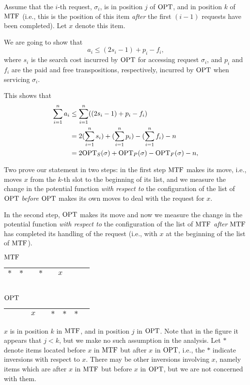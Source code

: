 \begin{frame}
Assume that the $i$-th request, $\sigma_i$, is in position $j$ of
$\mathrm{OPT}$, and in position $k$ of $\mathrm{MTF}$ (i.e., this is the position of this
item {\em after} the first $(i-1)$ requests have been completed).  Let
$x$ denote this item.

We are going to show that 
$$
a_i\le (2s_i-1)+p_i-f_i,
$$
where $s_i$ is the search cost incurred by $\mathrm{OPT}$ for accessing request
$\sigma_i$, and $p_i$ and $f_i$ are the paid and free transpositions,
respectively, incurred by $\mathrm{OPT}$ when servicing $\sigma_i$.  
\end{frame}

\begin{frame}
This
shows that
\begin{align*}
\sum_{i=1}^na_i & \le \sum_{i=1}^n((2s_i-1)+p_i-f_i) \\
&= 2(\sum_{i=1}^ns_i)+(\sum_{i=1}^np_i)-(\sum_{i=1}^nf_i)-n \\
&= 2\mathrm{OPT}_S(\sigma)+\mathrm{OPT}_P(\sigma)-\mathrm{OPT}_F(\sigma)-n,
\end{align*}
\end{frame}

\begin{frame}
Two prove our statement in two 
steps: in the first step $\mathrm{MTF}$ makes its move, i.e., moves
$x$ from the $k$-th slot to the beginning of its list, and we
measure the change in the potential function {\em with respect to} the
configuration of the list of $\mathrm{OPT}$ {\em before} $\mathrm{OPT}$ makes its own
moves to deal with the request for $x$.  

In the second step, $\mathrm{OPT}$
makes its move and now we measure the change in the potential function
{\em with respect to} the configuration of the list of $\mathrm{MTF}$ {\em
after} $\mathrm{MTF}$ has completed its handling of the request (i.e., with
$x$ at the beginning of the list of $\mathrm{MTF}$).
\end{frame}

\begin{frame}
\begin{center}
$\mathrm{MTF}$
\begin{tabular}
{|p{4mm}|p{4mm}|p{4mm}|p{4mm}|p{4mm}|p{4mm}|p{4mm}|p{4mm}|p{4mm}|}\hline
$\ast$ & $\ast$ && $\ast$ && $x$ &&& \\\hline\end{tabular} \\[5mm]
$\mathrm{OPT}$
\begin{tabular}
{|p{4mm}|p{4mm}|p{4mm}|p{4mm}|p{4mm}|p{4mm}|p{4mm}|p{4mm}|p{4mm}|}\hline
&&& $x$ && $\ast$ & $\ast$ & $\ast$ & \\\hline\end{tabular}
\end{center}

$x$ is in position $k$ in $\mathrm{MTF}$, and in position $j$ in
$\mathrm{OPT}$.  Note that in the figure it appears that $j<k$, but we make no
such assumption in the analysis.  Let $\ast$ denote items located
before $x$ in $\mathrm{MTF}$ but after $x$ in $\mathrm{OPT}$, i.e., the $\ast$
indicate inversions with respect to $x$.  There may be other
inversions involving $x$, namely items which are after $x$ in
$\mathrm{MTF}$ but before $x$ in $\mathrm{OPT}$, but we are not concerned with 
them.
\end{frame}

